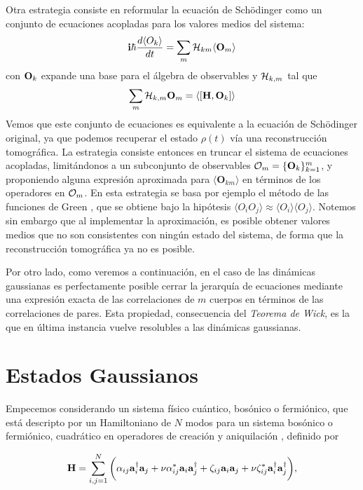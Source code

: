 \documentclass{report} %
\numberwithin{equation}{section}
\begin{document}
Otra estrategia consiste en reformular la ecuación de Sch\"odinger como un conjunto de ecuaciones acopladas para los valores medios del sistema:
$$
\mathbf{ i}\hbar\frac{d\langle O_k\rangle}{dt}=\sum_{m}{\cal H}_{k m}\langle {\bf O}_m\rangle
$$
con ${\bf O}_k$ expande una base para el álgebra de observables y ${\cal H}_{k,m}$ tal que 
$$
\sum_{m}{\cal H}_{k,m}{\bf O}_m = \langle [{\bf H},{\bf O}_k]\rangle
$$
Vemos que este conjunto de ecuaciones es equivalente a la ecuación de Sch\"odinger original, ya que podemos recuperar el estado $\rho(t)$ vía una reconstrucción tomográfica.
La estrategia consiste entonces en truncar el sistema de ecuaciones acopladas, limitándonos a un subconjunto de observables ${\cal O}_m =\{\mathbf{O}_k\}_{k=1}^{m}$, y proponiendo  alguna expresión aproximada para $\langle \mathbf{O}_{k m}\rangle$ en términos de los operadores en ${\cal O}_m$.
En esta estrategia se basa por ejemplo el método de las funciones de Green \cite{Fetter},
que se obtiene bajo la hipótesis $\langle O_{i}O_{j}\rangle\approx \langle O_{i}\rangle\langle O_{j}\rangle$. Notemos sin embargo que al implementar la aproximación,  es posible obtener valores medios que no son consistentes con ningún estado del sistema, de forma que la reconstrucción tomográfica ya no es posible.

Por otro lado, como veremos a continuación, en el caso de las dinámicas gaussianas es perfectamente posible cerrar la jerarquía de ecuaciones mediante una expresión exacta de las correlaciones de $m$ cuerpos en términos de las correlaciones de pares. Esta propiedad, consecuencia del \emph{Teorema de Wick}\cite{Fetter}, es la que en última instancia vuelve resolubles a las dinámicas gaussianas.  

\section{Estados Gaussianos}
Empecemos considerando un sistema físico cuántico, bosónico o fermiónico, que está descripto por un  Hamiltoniano de $N$ modos para un sistema bosónico o fermiónico, cuadrático en operadores de creación y aniquilación \cite{RMNPhysRevA.82.052332, PhysRevA.104.012415},
definido por

\begin{equation}
    {\bf H} = \sum_{i,j=1}^{N} \bigg(\alpha_{ij} {\bf a}^{\dagger}_i{\bf a}_j+\nu \alpha_{ij}^{*} {\bf a}_i{\bf a}^{\dagger}_j+\zeta_{ij}{\bf a}_i{\bf a}_j+\nu\zeta^{*}_{ij} {\bf a}^{\dagger}_i {\bf a}^{\dagger}_j\bigg),
\end{equation}
\end{document}
